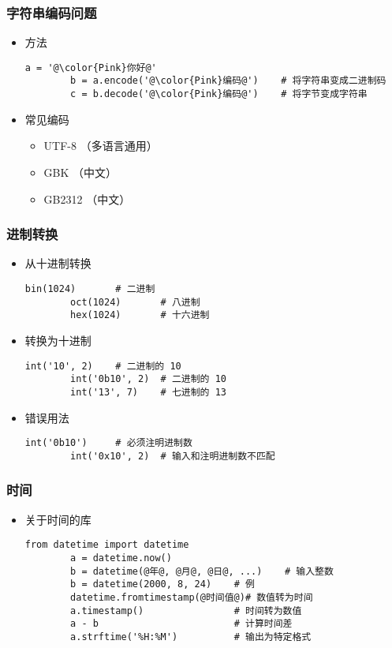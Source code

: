\begin{frame} [fragile]
	\frametitle{字符串编码问题}
	\linespread{1.25}
	\begin{itemize}
	\item 方法
		\begin{lstlisting}[style=pythonstyle, gobble=8, texcl, escapechar=@]
		a = '@\color{Pink}你好@'
		b = a.encode('@\color{Pink}编码@')	# 将字符串变成二进制码
		c = b.decode('@\color{Pink}编码@')	# 将字节变成字符串
		\end{lstlisting}
	\item 常见编码
		\begin{itemize}
		\item UTF-8 （多语言通用）
		\item GBK （中文）
		\item GB2312 （中文）
		\end{itemize}
	\end{itemize}
\end{frame}

\begin{frame} [fragile]
	\frametitle{进制转换}
	\begin{itemize}
	\item 从十进制转换
		\begin{lstlisting}[style=pythonstyle, gobble=8, texcl]
		bin(1024)		# 二进制
		oct(1024)		# 八进制
		hex(1024)		# 十六进制
		\end{lstlisting}
	\item 转换为十进制
		\begin{lstlisting}[style=pythonstyle, gobble=8, texcl]
		int('10', 2)	# 二进制的 10
		int('0b10', 2)	# 二进制的 10
		int('13', 7)	# 七进制的 13
		\end{lstlisting}
	\item 错误用法
		\begin{lstlisting}[style=pythonstyle, gobble=8, texcl]
		int('0b10')		# 必须注明进制数
		int('0x10', 2)	# 输入和注明进制数不匹配
		\end{lstlisting}
	\end{itemize}
\end{frame}

\begin{frame} [fragile]
	\frametitle{时间}
	\linespread{1.25}
	\begin{itemize}
	\item 关于时间的库
		\begin{lstlisting}[style=pythonstyle, gobble=8, texcl, escapechar=@]
		from datetime import datetime
		a = datetime.now()
		b = datetime(@年@, @月@, @日@, ...)	# 输入整数
		b = datetime(2000, 8, 24)	 # 例
		datetime.fromtimestamp(@时间值@)# 数值转为时间
		a.timestamp()				 # 时间转为数值
		a - b						 # 计算时间差
		a.strftime('%H:%M')			 # 输出为特定格式
		\end{lstlisting}
	\end{itemize}
\end{frame}


